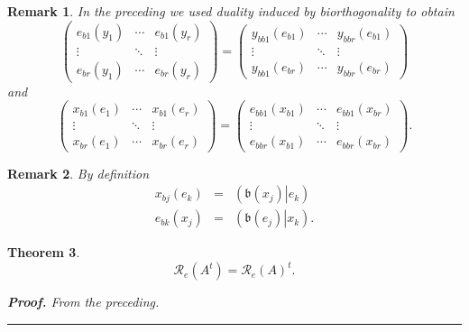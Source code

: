 \documentclass[aps,preprint]{revtex4}
\newtheorem{theorem}{Theorem}
\newtheorem{remark}[theorem]{Remark}
\newenvironment{proof}[1][Proof]{\noindent\textbf{#1.} }{\ \rule{0.5em}{0.5em}}
\begin{document}
\begin{remark}
\bigskip In the preceding we used duality induced by biorthogonality to
obtain 
\begin{equation}
\left( 
\begin{array}{ccc}
e_{b1}\left( y_{1}\right) & \cdots & e_{b1}\left( y_{r}\right) \\ 
\vdots & \ddots & \vdots \\ 
e_{br}\left( y_{1}\right) & \cdots & e_{br}\left( y_{r}\right)%
\end{array}%
\right) =\left( 
\begin{array}{ccc}
y_{bb1}\left( e_{b1}\right) & \cdots & y_{bbr}\left( e_{b1}\right) \\ 
\vdots & \ddots & \vdots \\ 
y_{bb1}\left( e_{br}\right) & \cdots & y_{bbr}\left( e_{br}\right)%
\end{array}%
\right)
\end{equation}%
and 
\begin{equation}
\left( 
\begin{array}{ccc}
x_{b1}\left( e_{1}\right) & \cdots & x_{b1}\left( e_{r}\right) \\ 
\vdots & \ddots & \vdots \\ 
x_{br}\left( e_{1}\right) & \cdots & x_{br}\left( e_{r}\right)%
\end{array}%
\right) =\left( 
\begin{array}{ccc}
e_{bb1}\left( x_{b1}\right) & \cdots & e_{bb1}\left( x_{br}\right) \\ 
\vdots & \ddots & \vdots \\ 
e_{bbr}\left( x_{b1}\right) & \cdots & e_{bbr}\left( x_{br}\right)%
\end{array}%
\right) .
\end{equation}
\end{remark}

\begin{remark}
By definition 
\begin{eqnarray}
x_{bj}\left( e_{k}\right) &=&\left( \left. \mathfrak{b}\left( x_{j}\right)
\right\vert e_{k}\right) \\
e_{bk}\left( x_{j}\right) &=&\left( \left. \mathfrak{b}\left( e_{j}\right)
\right\vert x_{k}\right) .
\end{eqnarray}
\end{remark}

\begin{theorem}
\begin{equation}
\mathcal{R}_{e}\left( A^{t}\right) =\mathcal{R}_{e}\left( A\right) ^{t}.
\end{equation}

\begin{proof}
From the preceding.
\end{proof}
\end{theorem}
\end{document}
